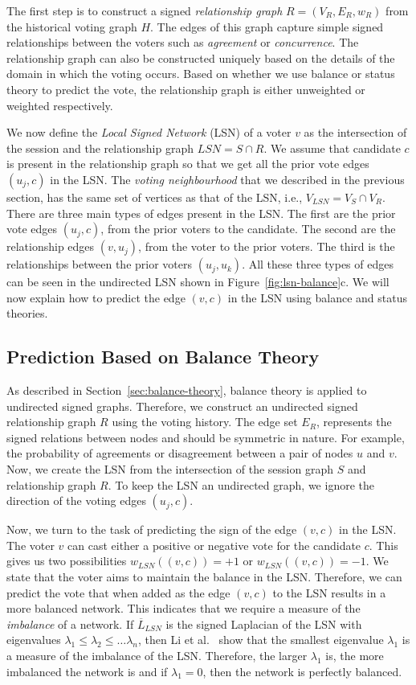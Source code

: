 The first step is to construct a signed \textit{relationship graph} $R=(V_R,E_R,w_R)$ from the historical voting graph $H$.
The edges of this graph capture simple signed relationships between the voters such as \textit{agreement} or \textit{concurrence}.
The relationship graph can also be constructed uniquely based on the details of the domain in which the voting occurs.
Based on whether we use balance or status theory to predict the vote, the relationship graph is either unweighted or weighted respectively.

We now define the \textit{Local Signed Network} (LSN) of a voter $v$ as the intersection of the session and the relationship graph $LSN=S \cap R$.
We assume that candidate $c$ is present in the relationship graph so that we get all the prior vote edges $(u_j,c)$ in the LSN.
The \textit{voting neighbourhood} that we described in the previous section, has the same set of vertices as that of the LSN, i.e., $V_{LSN}=V_S \cap V_R$.
There are three main types of edges present in the LSN.
The first are the prior vote edges $(u_j,c)$, from the prior voters to the candidate.
The second are the relationship edges $(v,u_j)$, from the voter to the prior voters.
The third is the relationships between the prior voters $(u_j,u_k)$.
All these three types of edges can be seen in the undirected LSN shown in Figure~\ref{fig:lsn-balance}c.
We will now explain how to predict the edge $(v,c)$ in the LSN using balance and status theories.  

\subsection{Prediction Based on Balance Theory}
\label{subsec:prediction-based-balance}
As described in Section~\ref{sec:balance-theory}, balance theory is applied to undirected signed graphs.
Therefore, we construct an undirected signed relationship graph $R$ using the voting history.
The edge set $E_{R}$, represents the signed relations between nodes and should be symmetric in nature.
For example, the probability of agreements or disagreement between a pair of nodes $u$ and $v$.
Now, we create the LSN from the intersection of the session graph $S$ and relationship graph $R$.
To keep the LSN an undirected graph, we ignore the direction of the voting edges $(u_j,c)$. 

Now, we turn to the task of predicting the sign of the edge $(v,c)$ in the LSN.
The voter $v$ can cast either a positive or negative vote for the candidate $c$.
This gives us two possibilities $w_{LSN}((v,c))=+1$ or $w_{LSN}((v,c))=-1$.
We state that the voter aims to maintain the balance in the LSN.
Therefore, we can predict the vote that when added as the edge $(v,c)$ to the LSN results in a more balanced network.
This indicates that we require a measure of the \textit{imbalance} of a network.
If $\overline{L}_{LSN}$ is the signed Laplacian of the LSN with eigenvalues $\lambda_1\leq\lambda_2\leq\dots\lambda_n$, then Li et al.\ \cite{li2016note} show that the smallest eigenvalue $\lambda_1$ is a measure of the imbalance of the LSN.
Therefore, the larger $\lambda_1$ is, the more imbalanced the network is and if $\lambda_1=0$, then the network is perfectly balanced. 
 
